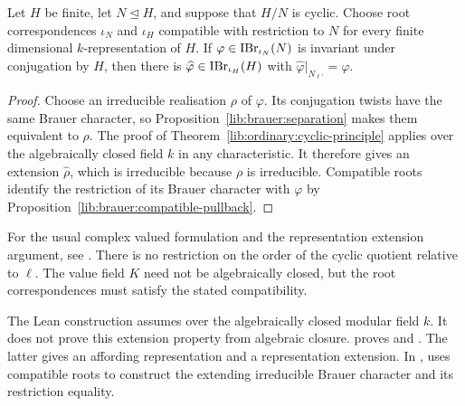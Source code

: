 \begin{theorem}
Let $H$ be finite, let $N\trianglelefteq H$, and suppose that $H/N$
is cyclic. Choose root correspondences $\iota_N$ and $\iota_H$
compatible with restriction to $N$ for every finite dimensional
$k$-representation of $H$. If
$\varphi\in\operatorname{IBr}_{\iota_N}(N)$ is invariant under conjugation by $H$,
then there is $\widehat\varphi\in\operatorname{IBr}_{\iota_H}(H)$ with
$\widehat\varphi|_{N_{\ell'}}=\varphi$.
\end{theorem}
\begin{proof}
Choose an irreducible realisation $\rho$ of $\varphi$. Its conjugation
twists have the same Brauer character, so
Proposition~\ref{lib:brauer:separation} makes them equivalent to $\rho$.
The proof of Theorem~\ref{lib:ordinary:cyclic-principle} applies over
the algebraically closed field $k$ in any characteristic. It therefore
gives an extension $\widehat\rho$, which is irreducible because
$\rho$ is irreducible. Compatible roots identify the restriction of
its Brauer character with $\varphi$ by
Proposition~\ref{lib:brauer:compatible-pullback}.
\end{proof}

For the usual complex valued formulation and the representation extension
argument, see \cite[Theorem~8.12]{Navarro1998}.
There is no restriction on the order of the cyclic quotient relative to
$\ell$. The value field $K$ need not be algebraically closed, but the
root correspondences must satisfy the stated compatibility.

\begin{implementation}
The Lean construction assumes
 over the
algebraically closed modular field $k$. It does not prove this
extension property from algebraic closure.
 proves
 and
.
The latter gives an affording representation and a representation
extension. In ,
uses compatible roots to construct the extending irreducible Brauer character
and its restriction equality.
\end{implementation}
